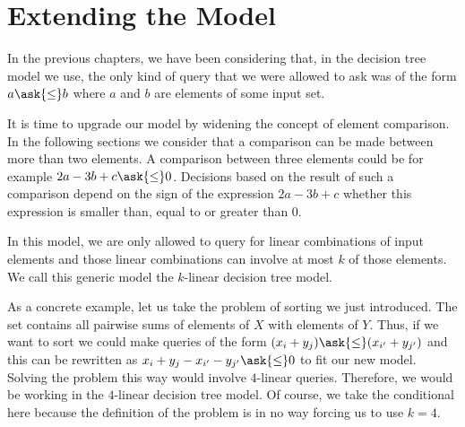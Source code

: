 \section{Extending the Model}

In the previous chapters, we have been considering that, in the decision tree
model we use, the only kind of query that we were allowed to ask was of the
form \(a \ask{\le} b \) where \(a\) and \(b\) are elements of some input set.

It is time to upgrade our model by widening the concept of element
comparison. In the following sections we consider that a comparison can be made
between more than two elements. A comparison between three elements could be
for example \(2a - 3b + c \ask{\le} 0\). Decisions based on the result of such
a comparison depend on the sign of the expression \(2a - 3b + c\) \ie whether
this expression is smaller than, equal to or greater than \(0\).

In this model, we are only allowed to query for linear combinations of
input elements and those linear combinations can involve at most \(k\) of those
elements. We call this generic model the \(k\)-linear decision tree
model.

As a concrete example, let us take the problem of sorting \XY we just introduced.
The set \XY contains all pairwise sums of elements of \(X\) with elements of
\(Y\). Thus, if we want to sort \XY we could make queries of the form \((x_i +
y_j) \ask{\le} (x_{i'} + y_{j'})\) and this can be rewritten as \( x_i +
y_j - x_{i'} - y_{j'} \ask{\le} 0\) to fit our new model. Solving the problem
this way would involve \(4\)-linear queries. Therefore, we would be working in
the \(4\)-linear decision tree model. Of course, we take the conditional here
because the definition of the problem is in no way forcing us to use \(k=4\).
